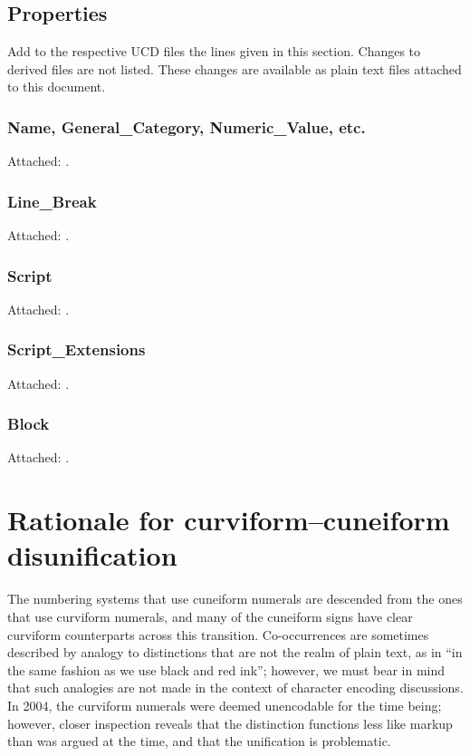 \documentclass[10pt, a4paper, twoside]{article}
\begin{document}
\subsection{Properties}
\label{properties}
Add to the respective UCD files the lines given in this section.
Changes to derived files are not listed.
These changes are available as plain text files attached to this document.
\subsubsection{Name, General\_Category, Numeric\_Value, etc.}
Attached: .
\subsubsection{Line\_Break}
Attached: .
\subsubsection{Script}
Attached: .
\subsubsection{Script\_Extensions}
Attached: .
\subsubsection{Block}
Attached: .

\section{Rationale for curviform--cuneiform disunification}
\label{disunificationRationale}
The numbering systems that use cuneiform numerals are descended from the ones that use curviform numerals,
and many of the cuneiform signs have clear curviform counterparts across this transition.
Co-occurrences are sometimes described by analogy to distinctions that are not the realm of plain text,
as in \cite[215]{Powell1972} ``in the same fashion as we use black and red ink'';
however, we must bear in mind that such analogies are not made in the context of character encoding discussions.
In 2004, the curviform numerals were deemed unencodable for the time being; however,
closer inspection reveals that the distinction functions less like markup than was argued at the time,
and that the unification is problematic.
\end{document}
